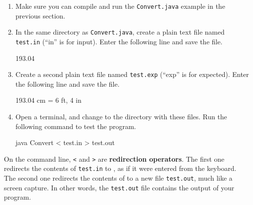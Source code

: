 \begin{enumerate}

\item Make sure you can compile and run the {\tt Convert.java} example in the previous section.

\item In the same directory as {\tt Convert.java}, create a plain text file named {\tt test.in} (``in'' is for input).
Enter the following line and save the file.

\begin{stdout}
193.04
\end{stdout}

\item Create a second plain text file named {\tt test.exp} (``exp'' is for expected).
Enter the following line and save the file.

\begin{stdout}
193.04 cm = 6 ft, 4 in
\end{stdout}

\item Open a terminal, and change to the directory with these files.
Run the following command to test the program.

\begin{stdout}
java Convert < test.in > test.out
\end{stdout}

\end{enumerate}


On the command line, {\tt <} and {\tt >} are {\bf redirection operators}.
The first one redirects the contents of {\tt test.in} to , as if it were entered from the keyboard.
The second one redirects the contents of  to a new file {\tt test.out}, much like a screen capture.
In other words, the {\tt test.out} file contains the output of your program.



